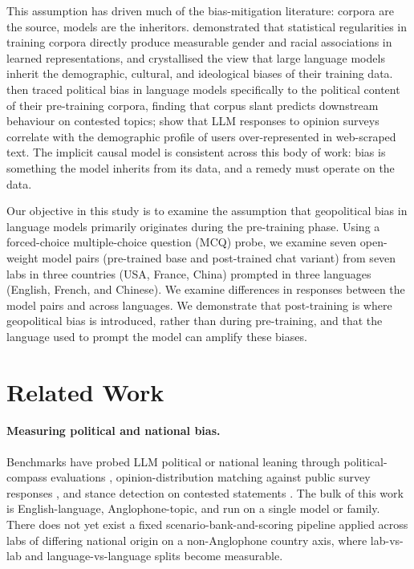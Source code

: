 \documentclass[letterpaper]{article} %
\begin{document}
This assumption has driven much of the bias-mitigation literature: corpora are the source, models are the inheritors. \citet{caliskan2017semantics} demonstrated that statistical regularities in training corpora directly produce measurable gender and racial associations in learned representations, and \citet{bender2021stochastic} crystallised the view that large language models inherit the demographic, cultural, and ideological biases of their training data. \citet{feng2023pretraining} then traced political bias in language models specifically to the political content of their pre-training corpora, finding that corpus slant predicts downstream behaviour on contested topics; \citet{santurkar2023whose} show that LLM responses to opinion surveys correlate with the demographic profile of users over-represented in web-scraped text. The implicit causal model is consistent across this body of work: bias is something the model inherits from its data, and a remedy must operate on the data.

Our objective in this study is to examine the assumption that geopolitical bias in language models primarily originates during the pre-training phase. Using a forced-choice multiple-choice question (MCQ) probe, we examine seven open-weight model pairs (pre-trained base and post-trained chat variant) from seven labs in three countries (USA, France, China) prompted in three languages (English, French, and Chinese). We examine differences in responses between the model pairs and across languages. We demonstrate that post-training is where geopolitical bias is introduced, rather than during pre-training, and that the language used to prompt the model can amplify these biases.

\section{Related Work}

\paragraph{Measuring political and national bias.} Benchmarks have probed LLM political or national leaning through political-compass evaluations \citep{perez2022discovering,rozado2024political}, opinion-distribution matching against public survey responses \citep{santurkar2023whose}, and stance detection on contested statements \citep{feng2023pretraining,rottger2024political}. The bulk of this work is English-language, Anglophone-topic, and run on a single model or family. There does not yet exist a fixed scenario-bank-and-scoring pipeline applied across labs of differing national origin on a non-Anglophone country axis, where lab-vs-lab and language-vs-language splits become measurable.
\end{document}

